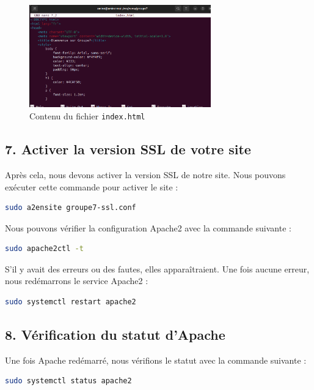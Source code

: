 \begin{figure}[h]
	\centering
	\includegraphics[width=0.7\textwidth]{HTTPS/index.png}
	\caption{Contenu du fichier \texttt{index.html}}
	\label{fig:index}
\end{figure}

\subsection*{7. Activer la version SSL de votre site}
Après cela, nous devons activer la version SSL de notre site. Nous pouvons exécuter cette commande pour activer le site :

\begin{lstlisting}[language=bash]
sudo a2ensite groupe7-ssl.conf
\end{lstlisting}

Nous pouvons vérifier la configuration Apache2 avec la commande suivante :

\begin{lstlisting}[language=bash]
sudo apache2ctl -t
\end{lstlisting}

S'il y avait des erreurs ou des fautes, elles apparaîtraient. Une fois aucune erreur, nous redémarrons le service Apache2 :

\begin{lstlisting}[language=bash]
sudo systemctl restart apache2
\end{lstlisting}

\subsection*{8. Vérification du statut d'Apache}
Une fois Apache redémarré, nous vérifions le statut avec la commande suivante :

\begin{lstlisting}[language=bash]
sudo systemctl status apache2
\end{lstlisting}

